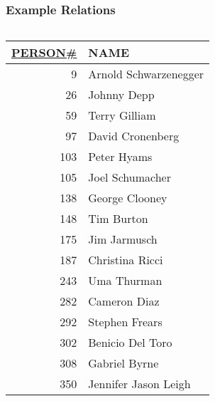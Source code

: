 \documentclass[dvipsnames]{beamer}
\theoremstyle{plain}
\begin{document}
\begin{frame}
  \frametitle{Example Relations}

  \begin{example}[PERSON]
    \begin{columns}[b]
      \begin{tiny}
      \begin{table}
        \begin{tabular}{|r|l|}\hline
\underline{PERSON\#} & NAME\\[2pt]\hline\hline
   9 & Arnold Schwarzenegger\\\hline
  26 & Johnny Depp          \\\hline
  59 & Terry Gilliam        \\\hline
  97 & David Cronenberg     \\\hline
 103 & Peter Hyams          \\\hline
 105 & Joel Schumacher      \\\hline
 138 & George Clooney       \\\hline
 148 & Tim Burton           \\\hline
 175 & Jim Jarmusch         \\\hline
 187 & Christina Ricci      \\\hline
 243 & Uma Thurman          \\\hline
 282 & Cameron Diaz         \\\hline
 292 & Stephen Frears       \\\hline
 302 & Benicio Del Toro     \\\hline
 308 & Gabriel Byrne        \\\hline
 350 & Jennifer Jason Leigh \\\hline
        \end{tabular}
      \end{table}
      \end{tiny}


\end{columns}
\end{example}
\end{frame}
\end{document}
